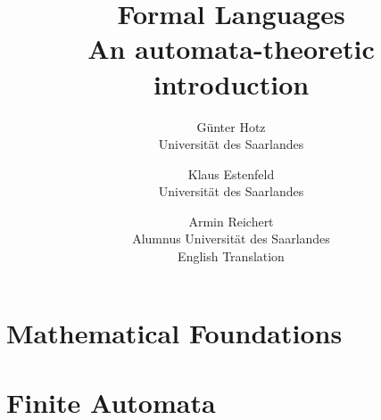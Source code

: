 \documentclass{amsbook}
\begin{document}
\title{
	Formal Languages\\
	An automata-theoretic introduction}

\author{
	G\"unter Hotz\\
	Universit\"at des Saarlandes
\and
	Klaus Estenfeld\\
	Universit\"at des Saarlandes
\and
	Armin Reichert\\
	Alumnus Universit\"at des Saarlandes\\
	English Translation
}

\maketitle


\tableofcontents


\chapter{Mathematical Foundations}







\chapter{Finite Automata}

\end{document}
